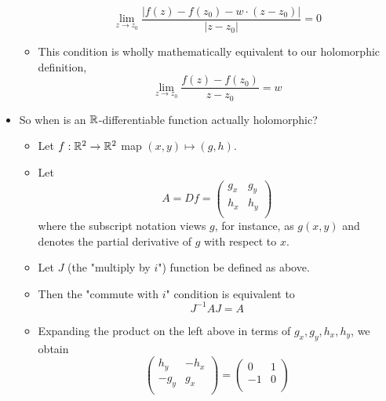 \documentclass[../notes.tex]{subfiles}
\begin{document}
\begin{itemize}
\begin{itemize}
        \begin{equation*}
            \lim_{z\to z_0}\frac{|f(z)-f(z_0)-w\cdot(z-z_0)|}{|z-z_0|} = 0
        \end{equation*}
        \item This condition is wholly mathematically equivalent to our holomorphic definition,
        \begin{equation*}
            \lim_{z\to z_0}\frac{f(z)-f(z_0)}{z-z_0} = w
        \end{equation*}
    \end{itemize}
    \item So when is an $\mathbb{R}$-differentiable function actually holomorphic?
    \begin{itemize}
        \item Let $f:\mathbb{R}^2\to\mathbb{R}^2$ map $(x,y)\mapsto(g,h)$.
        \item Let
        \begin{equation*}
            A = Df =
            \begin{pmatrix}
                g_x & g_y\\
                h_x & h_y\\
            \end{pmatrix}
        \end{equation*}
        where the subscript notation views $g$, for instance, as $g(x,y)$ and denotes the partial derivative of $g$ with respect to $x$.
        \item Let $J$ (the "multiply by $i$") function be defined as above.
        \item Then the "commute with $i$" condition is equivalent to
        \begin{equation*}
            J^{-1}AJ = A
        \end{equation*}
        \item Expanding the product on the left above in terms of $g_x,g_y,h_x,h_y$, we obtain
        \begin{equation*}
            \begin{pmatrix}
                h_y & -h_x\\
                -g_y & g_x\\
            \end{pmatrix}
            =
            \begin{pmatrix}
                0 & 1\\
                -1 & 0\\
            \end{pmatrix}

\end{equation*}
\end{itemize}
\end{itemize}
\end{document}

